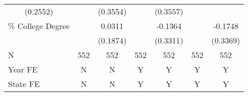 \begin{tabular}{lllllll}
  \multicolumn{1}{c}{(0.2552)} &
  \multicolumn{1}{c}{} &
  \multicolumn{1}{c}{(0.3554)} &
  \multicolumn{1}{c}{} &
  \multicolumn{1}{c}{(0.3557)} \\
\multicolumn{1}{l}{\% College Degree} &
  \multicolumn{1}{c}{} &
  \multicolumn{1}{c}{0.0311} &
  \multicolumn{1}{c}{} &
  \multicolumn{1}{c}{-0.1364} &
  \multicolumn{1}{c}{} &
  \multicolumn{1}{c}{-0.1748} \\
\multicolumn{1}{l}{} &
  \multicolumn{1}{c}{} &
  \multicolumn{1}{c}{(0.1874)} &
  \multicolumn{1}{c}{} &
  \multicolumn{1}{c}{(0.3311)} &
  \multicolumn{1}{c}{} &
  \multicolumn{1}{c}{(0.3369)} \\
\cline{1-7}
\multicolumn{1}{l}{N} &
  \multicolumn{1}{c}{552} &
  \multicolumn{1}{c}{552} &
  \multicolumn{1}{c}{552} &
  \multicolumn{1}{c}{552} &
  \multicolumn{1}{c}{552} &
  \multicolumn{1}{c}{552} \\
\multicolumn{1}{l}{Year FE} &
  \multicolumn{1}{c}{N} &
  \multicolumn{1}{c}{N} &
  \multicolumn{1}{c}{Y} &
  \multicolumn{1}{c}{Y} &
  \multicolumn{1}{c}{Y} &
  \multicolumn{1}{c}{Y} \\
\multicolumn{1}{l}{State FE} &
  \multicolumn{1}{c}{N} &
  \multicolumn{1}{c}{N} &
  \multicolumn{1}{c}{Y} &
  \multicolumn{1}{c}{Y} &
  \multicolumn{1}{c}{Y} &
  \multicolumn{1}{c}{Y} \\
\cline{1-7}
\end{tabular}
